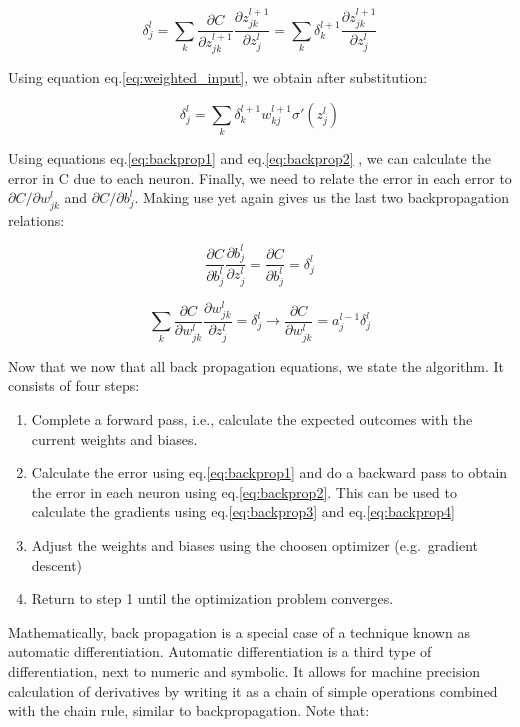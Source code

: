 \documentclass[12pt,a4paper,]{Dissertate}
\providecommand{\tightlist}{%
  \setlength{\itemsep}{0pt}\setlength{\parskip}{0pt}}
\begin{document}
\[
\delta^l_j = \sum_k \frac{\partial C}{\partial z^{l+1}_{jk}}\frac{\partial z^{l+1}_{jk}}{\partial z^l_{j}} = \sum_k \delta^{l+1}_k\frac{\partial z^{l+1}_{jk}}{\partial z^l_{j}}
\]

Using equation eq.\ref{eq:weighted_input}, we obtain after
substitution:

\begin{equation}
\delta^l_j = \sum_k\delta^{l+1}_kw^{l+1}_{kj}\sigma'(z^l_j)
\label{eq:backprop2}\end{equation}

Using equations eq.\ref{eq:backprop1} and eq.\ref{eq:backprop2} , we
can calculate the error in C due to each neuron. Finally, we need to
relate the error in each error to \(\partial C/\partial w^l_{jk}\) and
\(\partial C/\partial b^l_{j}\). Making use yet again gives us the last
two backpropagation relations:

\begin{equation}
\frac{\partial C}{\partial b^l_{j}}\frac{\partial b^l_{j}}{\partial z^l_{j}}=\frac{\partial C}{\partial b^l_{j}}=\delta^l_j
\label{eq:backprop3}\end{equation}

\begin{equation}
\sum_k\frac{\partial C}{\partial w^l_{jk}}\frac{\partial w^l_{jk}}{\partial z^l_{j}}=\delta^l_j\to \frac{\partial C}{\partial w^l_{jk}}=a^{l-1}_{j}\delta^l_j
\label{eq:backprop4}\end{equation}

Now that we now that all back propagation equations, we state the
algorithm. It consists of four steps:

\begin{enumerate}
\def\labelenumi{\arabic{enumi}.}
\tightlist
\item
  Complete a forward pass, i.e., calculate the expected outcomes with
  the current weights and biases.
\item
  Calculate the error using eq.\ref{eq:backprop1} and do a backward
  pass to obtain the error in each neuron using eq.\ref{eq:backprop2}.
  This can be used to calculate the gradients using
  eq.\ref{eq:backprop3} and eq.\ref{eq:backprop4}
\item
  Adjust the weights and biases using the choosen optimizer
  (e.g.~gradient descent)
\item
  Return to step 1 until the optimization problem converges.
\end{enumerate}

Mathematically, back propagation is a special case of a technique known
as automatic differentiation. Automatic differentiation is a third type
of differentiation, next to numeric and symbolic. It allows for machine
precision calculation of derivatives by writing it as a chain of simple
operations combined with the chain rule, similar to backpropagation.
Note that:
\end{document}
